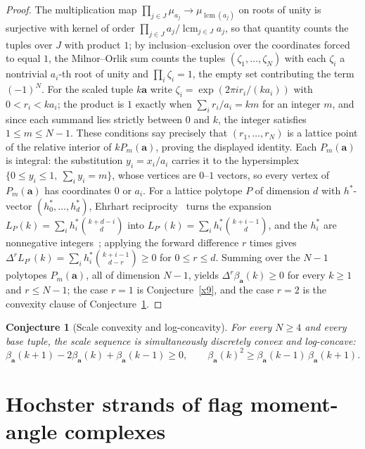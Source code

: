 \documentclass[11pt]{article}
\newtheorem{conjecture}{Conjecture}
\theoremstyle{definition}
\begin{document}
\begin{proof}
The multiplication map $\prod_{j\in J}\mu_{a_j}\to\mu_{\operatorname{lcm}(a_j)}$ on roots of unity is surjective with kernel of order $\prod_{j\in J}a_j/\operatorname{lcm}_{j\in J}a_j$, so that quantity counts the tuples over $J$ with product $1$; by inclusion--exclusion over the coordinates forced to equal $1$, the Milnor--Orlik sum counts the tuples $(\zeta_1,\ldots,\zeta_N)$ with each $\zeta_i$ a nontrivial $a_i$-th root of unity and $\prod_i\zeta_i=1$, the empty set contributing the term $(-1)^N$.  For the scaled tuple $k\mathbf a$ write $\zeta_i=\exp(2\pi ir_i/(ka_i))$ with $0<r_i<ka_i$; the product is $1$ exactly when $\sum_ir_i/a_i=km$ for an integer $m$, and since each summand lies strictly between $0$ and $k$, the integer satisfies $1\le m\le N-1$.  These conditions say precisely that $(r_1,\ldots,r_N)$ is a lattice point of the relative interior of $kP_m(\mathbf a)$, proving the displayed identity.  Each $P_m(\mathbf a)$ is integral: the substitution $y_i=x_i/a_i$ carries it to the hypersimplex $\{0\le y_i\le1,\ \sum_iy_i=m\}$, whose vertices are $0$--$1$ vectors, so every vertex of $P_m(\mathbf a)$ has coordinates $0$ or $a_i$.  For a lattice polytope $P$ of dimension $d$ with $h^{*}$-vector $(h^{*}_0,\ldots,h^{*}_d)$, Ehrhart reciprocity~\cite{Mac71} turns the expansion $L_P(k)=\sum_ih^{*}_i\binom{k+d-i}{d}$ into $L_{P^\circ}(k)=\sum_ih^{*}_i\binom{k+i-1}{d}$, and the $h^{*}_i$ are nonnegative integers~\cite{Sta80}; applying the forward difference $r$ times gives $\Delta^rL_{P^\circ}(k)=\sum_ih^{*}_i\binom{k+i-1}{d-r}\ge0$ for $0\le r\le d$.  Summing over the $N-1$ polytopes $P_m(\mathbf a)$, all of dimension $N-1$, yields $\Delta^r\beta_{\mathbf a}(k)\ge0$ for every $k\ge1$ and $r\le N-1$; the case $r=1$ is Conjecture~\ref{x9}, and the case $r=2$ is the convexity clause of Conjecture~\ref{x10}.
\end{proof}

\begin{conjecture}[Scale convexity and log-concavity]\label{x10}
For every $N\ge4$ and every base tuple, the scale sequence is simultaneously discretely convex and log-concave:
\[
\beta_{\mathbf a}(k+1)-2\beta_{\mathbf a}(k)+\beta_{\mathbf a}(k-1)\ge0,
\qquad
\beta_{\mathbf a}(k)^2\ge\beta_{\mathbf a}(k-1)\,\beta_{\mathbf a}(k+1).
\]
\end{conjecture}

\section{Hochster strands of flag moment-angle complexes}
\end{document}
